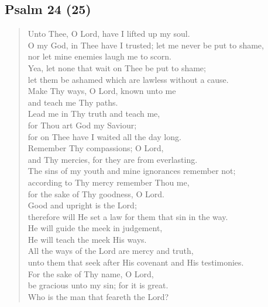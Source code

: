 {		\subsection*{Psalm 24 (25)}
			\begin{verse}
				Unto Thee, O Lord, have I lifted up my soul.\nolinebreak\\
				O my God, in Thee have I trusted; let me never be put to shame,\nolinebreak\\
				nor let mine enemies laugh me to scorn.\nolinebreak\\
				Yea, let none that wait on Thee be put to shame;\nolinebreak\\
				let them be ashamed which are lawless without a cause.\nolinebreak\\
				Make Thy ways, O Lord, known unto me\nolinebreak\\
				and teach me Thy paths.\nolinebreak\\
				Lead me in Thy truth and teach me,\nolinebreak\\
				for Thou art God my Saviour;\nolinebreak\\
				for on Thee have I waited all the day long.\nolinebreak\\
				Remember Thy compassions; O Lord,\nolinebreak\\
				and Thy mercies, for they are from everlasting.\nolinebreak\\
				The sins of my youth and mine ignorances remember not;\nolinebreak\\
				according to Thy mercy remember Thou me,\nolinebreak\\
				for the sake of Thy goodness, O Lord.\nolinebreak\\
				Good and upright is the Lord;\nolinebreak\\
				therefore will He set a law for them that sin in the way.\nolinebreak\\
				He will guide the meek in judgement,\nolinebreak\\
				He will teach the meek His ways.\nolinebreak\\
				All the ways of the Lord are mercy and truth,\nolinebreak\\
				unto them that seek after His covenant and His testimonies.\nolinebreak\\
				For the sake of Thy name, O Lord,\nolinebreak\\
				be gracious unto my sin; for it is great.\nolinebreak\\
				Who is the man that feareth the Lord?\nolinebreak\\

\end{verse}}
